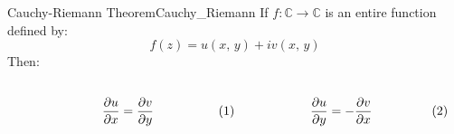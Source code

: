     \begin{ftheorem}{Cauchy-Riemann Theorem}{Cauchy_Riemann}
        If $f:\mathbb{C}\rightarrow\mathbb{C}$ is an entire function
        defined by:
        \begin{equation}
            f(z)=u(x,\,y)+iv(x,\,y)
        \end{equation}
        Then:
        \par
        \begin{subequations}
            \begin{minipage}{0.49\textwidth}
                \centering
                \begin{equation}
                    \frac{\partial{u}}{\partial{x}}=
                    \frac{\partial{v}}{\partial{y}}
                \end{equation}
            \end{minipage}
            \hfill
            \begin{minipage}{0.49\textwidth}
                \centering
                \begin{equation}
                    \frac{\partial{u}}{\partial{y}}=
                    -\frac{\partial{v}}{\partial{x}}
                \end{equation}
            \end{minipage}
        \end{subequations}
        \par
        \vspace{2.5ex}
    \end{ftheorem}
